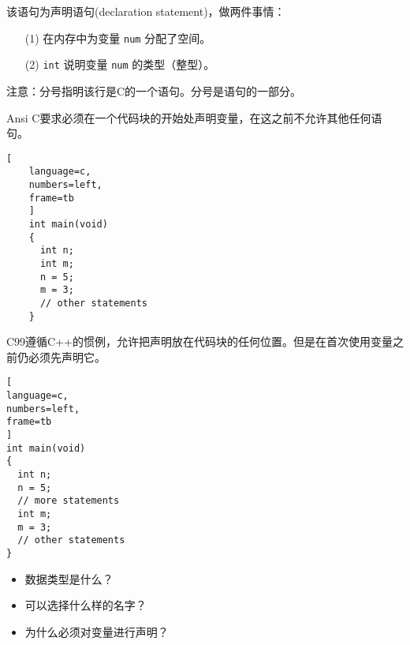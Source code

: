 \begin{frame}[fragile]

  
  该语句为声明语句(declaration statement)，做两件事情：\vspace{0.1in}
  \begin{itemize}
  \item[(1)]
    在内存中为变量 \lstinline|num| 分配了空间。\\[0.1in]
  \item[(2)]
    \lstinline|int| 说明变量 \lstinline|num| 的类型（整型）。
  \end{itemize} \vspace{0.1in}

  \pause 

  注意：分号指明该行是C的一个语句。分号是语句的一部分。
  
\end{frame}

\begin{frame}[fragile]
  Ansi C要求必须在一个代码块的开始处声明变量，在这之前不允许其他任何语句。

  \begin{lstlisting}[
    language=c,
    numbers=left,
    frame=tb
    ]
    int main(void)
    {
      int n;
      int m;
      n = 5;
      m = 3;
      // other statements
    }
  \end{lstlisting}
\end{frame}

\begin{frame}[fragile]
  C99遵循C++的惯例，允许把声明放在代码块的任何位置。但是在首次使用变量之前仍必须先声明它。

  \begin{lstlisting}[
language=c,
numbers=left,
frame=tb
]
int main(void)
{
  int n;
  n = 5;
  // more statements
  int m;
  m = 3;
  // other statements
}
  \end{lstlisting}
\end{frame}


\begin{frame}[fragile]
  \begin{question}[]{}
    \begin{itemize}
    \item 数据类型是什么？
    \item 可以选择什么样的名字？
    \item 为什么必须对变量进行声明？
    \end{itemize}
  \end{question}
\end{frame}

